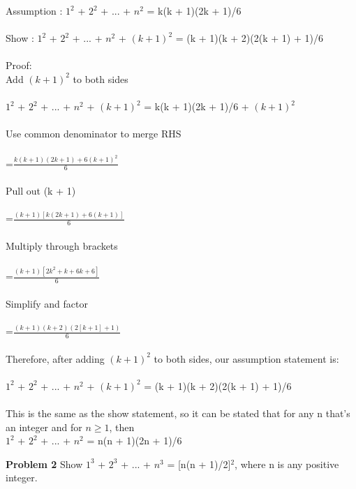 \documentclass[12pt]{article}
\begin{document}
Assumption : $1^{2}$ + $2^{2}$ + ... + $n^{2}$ = k(k + 1)(2k + 1)/6 \\
\\
Show : $1^{2}$ + $2^{2}$ + ... + $n^{2}$ + $(k + 1)^{2}$ = (k + 1)(k + 2)(2(k + 1) + 1)/6 \\
\\

Proof: \\
	Add $(k + 1)^{2}$ to both sides \\
	\\
	 $1^{2}$ + $2^{2}$ + ... + $n^{2}$ + $(k + 1)^{2}$ = k(k + 1)(2k + 1)/6 + $(k + 1)^{2}$ \\
\\
	 Use common denominator to merge RHS \\
	 \\
	 =$\frac{k(k+1)(2k+1)+6(k + 1)^{2}}{6}$ \\
	 \\
	 Pull out (k + 1)\\
	 \\
	 =$\frac{(k+1)[k(2k+1)+6(k+1)]}{6}$ \\
	 \\
	 Multiply through brackets \\
	 \\
	 =$\frac{(k+1)[2k^{2}+k+6k+6]}{6}$ \\
	 \\
	 Simplify and factor \\
	 \\
	 =$\frac{(k+1)(k+2)(2[k+1]+1)}{6}$ \\
	 \\
	 Therefore, after adding $(k + 1)^{2}$ to both sides, our assumption statement is: \\
	 \\
	 $1^{2}$ + $2^{2}$ + ... + $n^{2}$ + $(k + 1)^{2}$ = (k + 1)(k + 2)(2(k + 1) + 1)/6 \\
	 \\
	 This is the same as the show statement, so it can be stated that for any n that's an integer
	 and for $n\geq1$, then \\
	 $1^{2}$ + $2^{2}$ + ... + $n^{2}$ = n(n + 1)(2n + 1)/6




\par

\par
\bigskip
{\bf Problem
2
}
Show $1^{3}$ + $2^{3}$ + ... + $n^{3}$ = [n(n + 1)/2]$^{2}$, where n is any positive integer.
\end{document}
